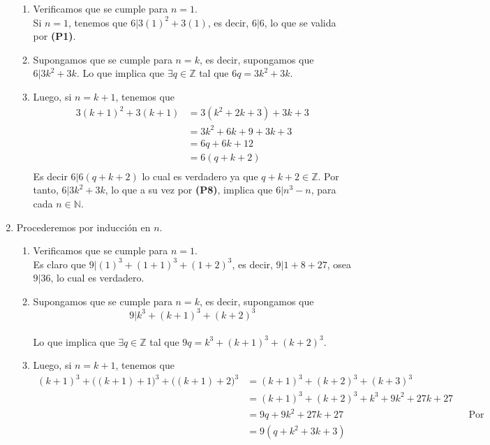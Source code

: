 \documentclass[11pt]{article}
\newcommand{\N}{\mathbb{N}}
\newcommand{\Z}{\mathbb{Z}}
\begin{document}
\begin{enumerate}[label=4.\arabic*]
    \begin{enumerate}[label=\roman*)]
      \item Verificamos que se cumple para $n=1$. \\ Si $n=1$, tenemos que $6|3(1)^2+3(1)$, es decir, $6|6$, lo que se valida por \textbf{(P1)}.
      \item Supongamos que se cumple para $n=k$, es decir, supongamos que $6|3k^2+3k$. Lo que implica que $\exists q\in \Z$ tal que $6q=3k^2+3k$.
      \item Luego, si $n=k+1$, tenemos que
      \begin{align*}
        3(k+1)^2+3(k+1) &= 3(k^2+2k+3)+3k+3  \\
        &= 3k^2+6k+9+3k+3 \\
        &= 6q+6k+12 \\
        &= 6(q+k+2) \\
      \end{align*}
      Es decir $6|6(q+k+2)$ lo cual es verdadero ya que $q+k+2 \in \Z$. Por tanto, $6|3k^2+3k$, lo que a su vez por \textbf{(P8)}, implica que $6|n^3-n$, para cada $n\in \N$.
    \end{enumerate}
  \item Procederemos por inducción en $n$.
    \begin{enumerate}[label=\roman*)]
      \item Verificamos que se cumple para $n=1$. \\ Es claro que $9|(1)^3+(1+1)^3+(1+2)^3$, es decir, $9|1+8+27$, osea $9|36$, lo cual es verdadero.
      \item Supongamos que se cumple para $n=k$, es decir, supongamos que \[9|k^3+(k+1)^3+(k+2)^3\] \\ Lo que implica que $\exists q \in \Z$ tal que $9q=k^3+(k+1)^3+(k+2)^3$.
      \item Luego, si $n=k+1$, tenemos que
      \begin{align*}
        (k+1)^3+\big((k+1)+1\big)^3+\big((k+1)+2\big)^3 &= (k+1)^3+(k+2)^3+(k+3)^3 \\
        &= (k+1)^3+(k+2)^3+k^3+9k^2+27k+27 \\
        &= 9q+9k^2+27k+27 && \text{Por (ii)} \\
        &= 9(q+k^2+3k+3)
      \end{align*}


\end{enumerate}
\end{enumerate}
\end{document}

